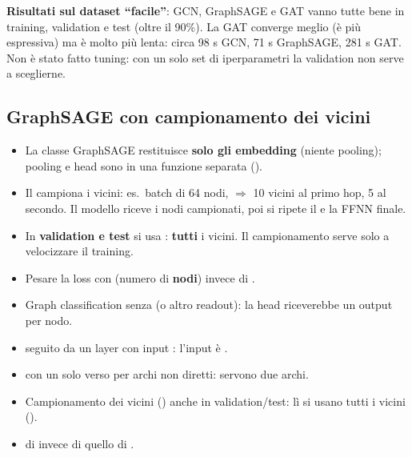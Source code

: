 \textbf{Risultati sul dataset ``facile''}: GCN, GraphSAGE e GAT vanno tutte bene in training, validation e test (oltre il 90\%). La GAT
converge meglio (è più espressiva) ma è molto più lenta: circa 98 s GCN, 71 s GraphSAGE, 281 s GAT. Non è stato fatto tuning: con un solo
set di iperparametri la validation non serve a sceglierne.

\subsection{GraphSAGE con campionamento dei vicini}
\begin{itemize}
  \item La classe GraphSAGE restituisce \textbf{solo gli embedding} (niente pooling); pooling e head sono in una funzione separata
        ().
  \item Il  campiona i vicini: es.\ batch di 64 nodi,  $\Rightarrow$ 10 vicini al primo
        hop, 5 al secondo. Il modello riceve i nodi campionati, poi si ripete il  e la FFNN finale.
  \item In \textbf{validation e test} si usa \code{[-1]}: \textbf{tutti} i vicini. Il campionamento serve solo a velocizzare il training.
\end{itemize}

\begin{attenzione}
\begin{itemize}
  \item Pesare la loss con  (numero di \textbf{nodi}) invece di .
  \item Graph classification senza  (o altro readout): la head riceverebbe un output per nodo.
  \item {} seguito da un layer con input : l'input è .
  \item {} con un solo verso per archi non diretti: servono due archi.
  \item Campionamento dei vicini () anche in validation/test: lì si usano tutti i vicini (\code{[-1]}).
  \item {} di  invece di quello di .
\end{itemize}
\end{attenzione}

